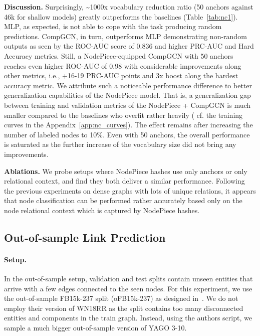 \documentclass{article} \usepackage{iclr2022_conference,times}
\begin{document}
\textbf{Discussion.} 
Surprisingly,  \textasciitilde{}1000x vocabulary reduction ratio (50 anchors against 46k for shallow models) greatly outperforms the baselines (Table~\ref{tab:nc1}). 
MLP, as expected, is not able to cope with the task producing random predictions. 
CompGCN, in turn, outperforms MLP demonstrating non-random outputs as seen by the ROC-AUC score of 0.836 and higher PRC-AUC and Hard Accuracy metrics. 
Still, a NodePiece-equipped CompGCN with 50 anchors reaches even higher ROC-AUC of 0.98 with considerable improvements along other metrics, i.e., +16-19 PRC-AUC points and 3x boost along the hardest accuracy metric.
We attribute such a noticeable performance difference to better generalization capabilities of the NodePiece model. 
That is, a generalization gap between training and validation metrics of the NodePiece + CompGCN is much smaller compared to the baselines who overfit rather heavily ( cf. the training curves in the Appendix~\ref{app:nc_curves}). 
The effect remains after increasing the number of labeled nodes to 10\%. 
Even with 50 anchors, the overall performance is saturated as the further increase of the vocabulary size did not bring any improvements.

\textbf{Ablations.} We probe setups where NodePiece hashes use only anchors or only relational context, and find they both deliver a similar performance. 
Following the previous experiments on dense graphs with lots of unique relations, it appears that node classification can be performed rather accurately based only on the node relational context which is captured by NodePiece hashes. 


\subsection{Out-of-sample Link Prediction}

\paragraph{Setup.}
In the out-of-sample setup, validation and test splits contain unseen entities that arrive with a few edges connected to the seen nodes.
For this experiment, we use the out-of-sample FB15k-237 split (oFB15k-237) as designed in~\citet{albooyeh-etal-2020-sample}.
We do not employ their version of WN18RR as the split contains too many disconnected entities and components in the train graph. 
Instead, using the authors script, we sample a much bigger out-of-sample version of YAGO 3-10.
\end{document}
